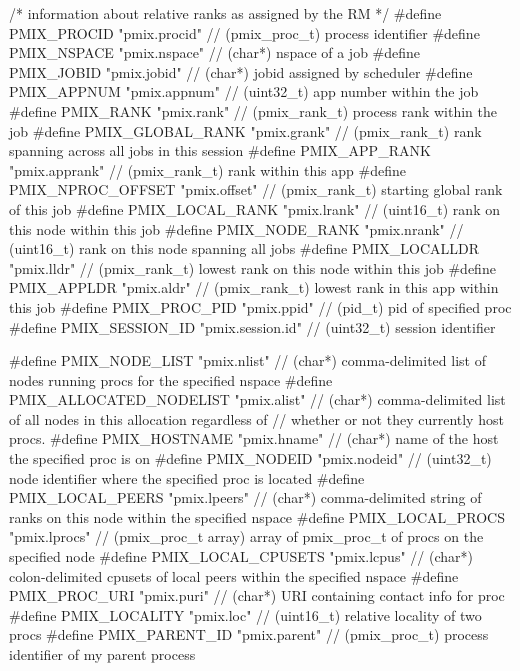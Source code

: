 \begin{codepar}
/* information about relative ranks as assigned by the RM */
#define PMIX_PROCID                         "pmix.procid"           // (pmix_proc_t) process identifier
#define PMIX_NSPACE                         "pmix.nspace"           // (char*) nspace of a job
#define PMIX_JOBID                          "pmix.jobid"            // (char*) jobid assigned by scheduler
#define PMIX_APPNUM                         "pmix.appnum"           // (uint32_t) app number within the job
#define PMIX_RANK                           "pmix.rank"             // (pmix_rank_t) process rank within the job
#define PMIX_GLOBAL_RANK                    "pmix.grank"            // (pmix_rank_t) rank spanning across all jobs in this session
#define PMIX_APP_RANK                       "pmix.apprank"          // (pmix_rank_t) rank within this app
#define PMIX_NPROC_OFFSET                   "pmix.offset"           // (pmix_rank_t) starting global rank of this job
#define PMIX_LOCAL_RANK                     "pmix.lrank"            // (uint16_t) rank on this node within this job
#define PMIX_NODE_RANK                      "pmix.nrank"            // (uint16_t) rank on this node spanning all jobs
#define PMIX_LOCALLDR                       "pmix.lldr"             // (pmix_rank_t) lowest rank on this node within this job
#define PMIX_APPLDR                         "pmix.aldr"             // (pmix_rank_t) lowest rank in this app within this job
#define PMIX_PROC_PID                       "pmix.ppid"             // (pid_t) pid of specified proc
#define PMIX_SESSION_ID                     "pmix.session.id"       // (uint32_t) session identifier

#define PMIX_NODE_LIST                      "pmix.nlist"            // (char*) comma-delimited list of nodes running procs for the specified nspace
#define PMIX_ALLOCATED_NODELIST             "pmix.alist"            // (char*) comma-delimited list of all nodes in this allocation regardless of
                                                                    //         whether or not they currently host procs.
#define PMIX_HOSTNAME                       "pmix.hname"            // (char*) name of the host the specified proc is on
#define PMIX_NODEID                         "pmix.nodeid"           // (uint32_t) node identifier where the specified proc is located
#define PMIX_LOCAL_PEERS                    "pmix.lpeers"           // (char*) comma-delimited string of ranks on this node within the specified nspace
#define PMIX_LOCAL_PROCS                    "pmix.lprocs"           // (pmix_proc_t array) array of pmix_proc_t of procs on the specified node
#define PMIX_LOCAL_CPUSETS                  "pmix.lcpus"            // (char*) colon-delimited cpusets of local peers within the specified nspace
#define PMIX_PROC_URI                       "pmix.puri"             // (char*) URI containing contact info for proc
#define PMIX_LOCALITY                       "pmix.loc"              // (uint16_t) relative locality of two procs
#define PMIX_PARENT_ID                      "pmix.parent"           // (pmix_proc_t) process identifier of my parent process


\end{codepar}
